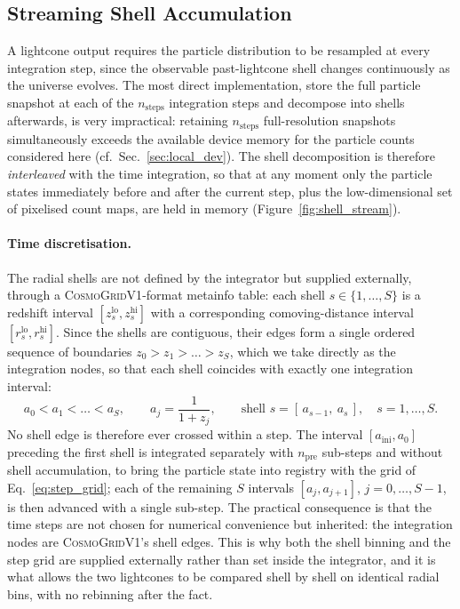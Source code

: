 \documentclass{report}
\begin{document}
\subsection{Streaming Shell Accumulation}
\label{sec:shell_builder_core}

A lightcone output requires the particle distribution to be resampled at every integration step, since the observable past-lightcone shell changes continuously as the universe evolves. The most direct implementation, store the full particle snapshot at each of the \mbox{$n_{\mathrm{steps}}$} integration steps and decompose into shells afterwards, is very impractical: retaining \mbox{$n_{\mathrm{steps}}$} full-resolution snapshots simultaneously exceeds the available device memory for the particle counts considered here  (cf.\ Sec.~\ref{sec:local_dev}).
The shell decomposition is therefore \emph{interleaved} with the time integration, so that at any moment only the particle states immediately before and after the current step, plus the low-dimensional set of pixelised count maps, are held in memory (Figure~\ref{fig:shell_stream}).

\paragraph{Time discretisation.} The radial shells are not defined by the integrator but
supplied externally, through a \textsc{CosmoGridV1}-format metainfo table: each shell
$s \in \{1,\dots,S\}$ is a redshift interval $[z_s^{\mathrm{lo}}, z_s^{\mathrm{hi}}]$ with a
corresponding comoving-distance interval $[r_s^{\mathrm{lo}}, r_s^{\mathrm{hi}}]$. Since the
shells are contiguous, their edges form a single ordered sequence of boundaries
$z_0 > z_1 > \dots > z_S$, which we take directly as the integration nodes, so that each shell
coincides with exactly one integration interval:
\begin{equation}
  a_0 < a_1 < \dots < a_S, \qquad a_j = \frac{1}{1+z_j}, \qquad
  \text{shell } s = [\,a_{s-1},\ a_s\,], \quad s = 1,\dots,S.
  \label{eq:step_grid}
\end{equation}
No shell edge is therefore ever crossed within a step. The interval
$[a_{\mathrm{ini}}, a_0]$ preceding the first shell is integrated separately with
$n_{\mathrm{pre}}$ sub-steps and without shell accumulation, to bring the particle state into
registry with the grid of Eq.~\eqref{eq:step_grid}; each of the remaining $S$ intervals
$[a_j, a_{j+1}]$, $j = 0,\dots,S-1$, is then advanced with a single sub-step. The practical consequence is that the time steps are not chosen for numerical convenience but inherited: the integration nodes are \textsc{CosmoGridV1}'s shell edges. This is why both the shell binning and the step grid are supplied externally rather than set inside the integrator, and it is what allows the two lightcones to be compared shell by shell on identical radial bins, with no rebinning after the fact.
\end{document}
